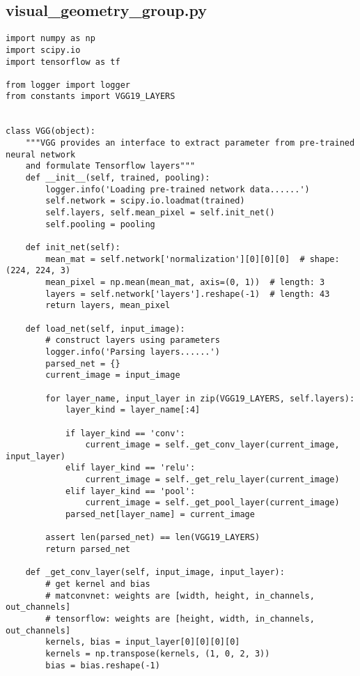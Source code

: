 
\newpage
\begin{spacing}{1.2}
\section{visual\_geometry\_group.py}
\label{sec:code:vgg}
\begin{lstlisting}
import numpy as np
import scipy.io
import tensorflow as tf

from logger import logger
from constants import VGG19_LAYERS


class VGG(object):
    """VGG provides an interface to extract parameter from pre-trained neural network
    and formulate Tensorflow layers"""
    def __init__(self, trained, pooling):
        logger.info('Loading pre-trained network data......')
        self.network = scipy.io.loadmat(trained)
        self.layers, self.mean_pixel = self.init_net()
        self.pooling = pooling

    def init_net(self):
        mean_mat = self.network['normalization'][0][0][0]  # shape: (224, 224, 3)
        mean_pixel = np.mean(mean_mat, axis=(0, 1))  # length: 3
        layers = self.network['layers'].reshape(-1)  # length: 43
        return layers, mean_pixel

    def load_net(self, input_image):
        # construct layers using parameters
        logger.info('Parsing layers......')
        parsed_net = {}
        current_image = input_image

        for layer_name, input_layer in zip(VGG19_LAYERS, self.layers):
            layer_kind = layer_name[:4]

            if layer_kind == 'conv':
                current_image = self._get_conv_layer(current_image, input_layer)
            elif layer_kind == 'relu':
                current_image = self._get_relu_layer(current_image)
            elif layer_kind == 'pool':
                current_image = self._get_pool_layer(current_image)
            parsed_net[layer_name] = current_image

        assert len(parsed_net) == len(VGG19_LAYERS)
        return parsed_net

    def _get_conv_layer(self, input_image, input_layer):
        # get kernel and bias
        # matconvnet: weights are [width, height, in_channels, out_channels]
        # tensorflow: weights are [height, width, in_channels, out_channels]
        kernels, bias = input_layer[0][0][0][0]
        kernels = np.transpose(kernels, (1, 0, 2, 3))
        bias = bias.reshape(-1)


\end{lstlisting}
\end{spacing}
